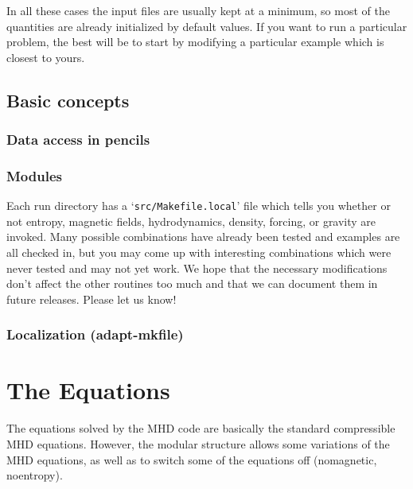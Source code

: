\documentclass[12pt,twoside,notitlepage,a4paper]{article}
\newcommand{\file}[1]{`\texttt{#1}'}
\begin{document}
In all these cases the input files are usually kept at a minimum, so most of the
quantities are already initialized by default values. If you want to run a particular
problem, the best will be to start by modifying a particular example which is closest
to yours.


\subsection{Basic concepts}


\subsubsection{Data access in pencils}

\subsubsection{Modules}

Each run directory has a \file{src/Makefile.local} file which tells you
whether or not entropy, magnetic fields, hydrodynamics, density, forcing,
or gravity are invoked. Many possible combinations have already been tested
and examples are all checked in, but you may come up with interesting
combinations which were never tested and may not yet work. We hope that
the necessary modifications don't affect the other routines too much and
that we can document them in future releases. Please let us know!

\subsubsection{Localization (adapt-mkfile)}




\section{The Equations}

The equations solved by the MHD code are basically the standard
compressible MHD equations. However, the modular structure allows
some variations of the MHD equations, as well as to switch
some of the equations off (nomagnetic, noentropy).
\end{document}
